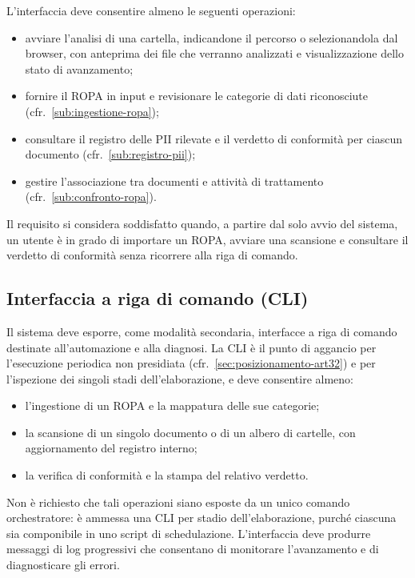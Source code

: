 L'interfaccia deve consentire almeno le seguenti operazioni:
\begin{itemize}
	\item avviare l'analisi di una cartella, indicandone il percorso o selezionandola dal browser, con anteprima dei file che verranno analizzati e visualizzazione dello stato di avanzamento;
	\item fornire il ROPA in input e revisionare le categorie di dati riconosciute (cfr.~\ref{sub:ingestione-ropa});
	\item consultare il registro delle PII rilevate e il verdetto di conformità per ciascun documento (cfr.~\ref{sub:registro-pii});
	\item gestire l'associazione tra documenti e attività di trattamento (cfr.~\ref{sub:confronto-ropa}).
\end{itemize} \medskip

Il requisito si considera soddisfatto quando, a partire dal solo avvio del sistema, un utente è in grado di importare un ROPA, avviare una scansione e consultare il verdetto di conformità senza ricorrere alla riga di comando.

\subsection{Interfaccia a riga di comando (CLI)}
\label{sub:cli}
Il sistema deve esporre, come modalità secondaria, interfacce a riga di comando destinate all'automazione e alla diagnosi. La CLI è il punto di aggancio per l'esecuzione periodica non presidiata (cfr.~\ref{sec:posizionamento-art32}) e per l'ispezione dei singoli stadi dell'elaborazione, e deve consentire almeno:
\begin{itemize}
	\item l'ingestione di un ROPA e la mappatura delle sue categorie;
	\item la scansione di un singolo documento o di un albero di cartelle, con aggiornamento del registro interno;
	\item la verifica di conformità e la stampa del relativo verdetto.
\end{itemize} \medskip

Non è richiesto che tali operazioni siano esposte da un unico comando orchestratore: è ammessa una CLI per stadio dell'elaborazione, purché ciascuna sia componibile in uno script di schedulazione. L'interfaccia deve produrre messaggi di log progressivi che consentano di monitorare l'avanzamento e di diagnosticare gli errori.

